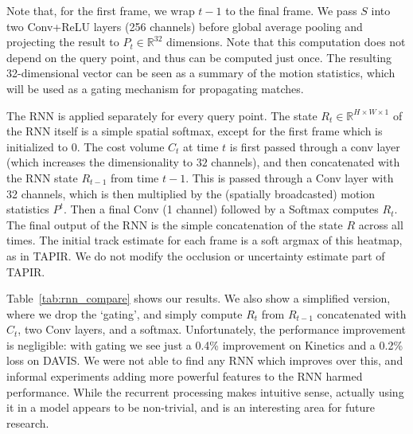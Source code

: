 \documentclass[10pt,twocolumn,letterpaper]{article}
\begin{document}
Note that, for the first frame, we wrap $t-1$ to the final frame.  We pass $S$ into two Conv+ReLU layers (256 channels) before global average pooling and projecting the result to $P_{t}\in\mathbb{R}^{32}$ dimensions.  Note that this computation does not depend on the query point, and thus can be computed just once.  The resulting 32-dimensional vector can be seen as a summary of the motion statistics, which will be used as a gating mechanism for propagating matches.

The RNN is applied separately for every query point.  The state $R_t\in{\mathbb{R}^{H\times W\times 1}}$ of the RNN itself is a simple spatial softmax, except for the first frame which is initialized to 0.  The cost volume $C_{t}$ at time $t$ is first passed through a conv layer (which increases the dimensionality to $32$ channels), and then concatenated with the RNN state $R_{t-1}$ from time $t-1$.   This is passed through a Conv layer with 32 channels, which is then multiplied by the (spatially broadcasted) motion statistics $P^{t}$.  Then a final Conv (1 channel) followed by a Softmax computes $R_{t}$.  The final output of the RNN is the simple concatenation of the state $R$ across all times. The initial track estimate for each frame is a soft argmax of this heatmap, as in TAPIR.  We do not modify the occlusion or uncertainty estimate part of TAPIR.

Table~\ref{tab:rnn_compare} shows our results.  We also show a simplified version, where we drop the `gating', and simply compute $R_{t}$ from $R_{t-1}$ concatenated with $C_{t}$, two Conv layers, and a softmax.  Unfortunately, the performance improvement is negligible: with gating we see just a 0.4\% improvement on Kinetics and a 0.2\% loss on DAVIS.  We were not able to find any RNN which improves over this, and informal experiments adding more powerful features to the RNN harmed performance.  While the recurrent processing makes intuitive sense, actually using it in a model appears to be non-trivial, and is an interesting area for future research.


\begin{table}[t]
\caption{\textbf{Comparison between the layer kernel type in iterative updates.} We find that depthwise conv works slightly better than a dense 1D convolution, even though the latter has more parameters.}
\label{tab:conv_kernel_compare}
\end{table}
\end{document}
